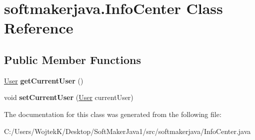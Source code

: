 \hypertarget{classsoftmakerjava_1_1_info_center}{}\section{softmakerjava.\+Info\+Center Class Reference}
\label{classsoftmakerjava_1_1_info_center}
\subsection*{Public Member Functions}
\begin{DoxyCompactItemize}
\item 
\hyperlink{classsoftmakerjava_1_1_user}{User} {\bfseries get\+Current\+User} ()\hypertarget{classsoftmakerjava_1_1_info_center_a6350ea9cb7a0fea7ba40ac4d8221043c}{}\label{classsoftmakerjava_1_1_info_center_a6350ea9cb7a0fea7ba40ac4d8221043c}

\item 
void {\bfseries set\+Current\+User} (\hyperlink{classsoftmakerjava_1_1_user}{User} current\+User)\hypertarget{classsoftmakerjava_1_1_info_center_acab3307193c7761a3a25466c0e439b1f}{}\label{classsoftmakerjava_1_1_info_center_acab3307193c7761a3a25466c0e439b1f}

\end{DoxyCompactItemize}


The documentation for this class was generated from the following file\+:\begin{DoxyCompactItemize}
\item 
C\+:/\+Users/\+Wojtek\+K/\+Desktop/\+Soft\+Maker\+Java1/src/softmakerjava/Info\+Center.\+java\end{DoxyCompactItemize}
